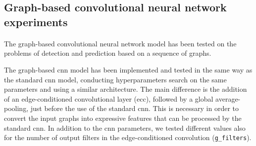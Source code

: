 \subsection{Graph-based convolutional neural network experiments}
\paragraph{} The graph-based convolutional neural network model has been tested on the problems of detection and prediction based on a sequence of graphs.

The graph-based \acs{cnn} model has been implemented and tested in the same way as the standard \acs{cnn} model, conducting hyperparameters search on the same parameters and using a similar architecture. The main difference is the addition of an edge-conditioned convolutional layer (\acs{ecc}), followed by a global average-pooling, just before the use of the standard \acs{cnn}. This is necessary in order to convert the input graphs into expressive features that can be processed by the standard \acs{cnn}. In addition to the \acs{cnn} parameters, we tested different values also for the number of output filters in the edge-conditioned convolution (\texttt{g\_filters}).

